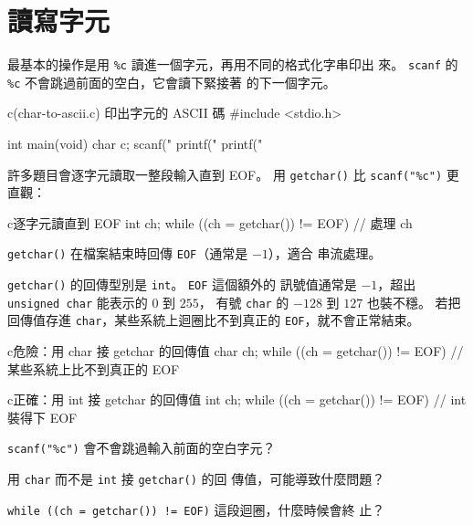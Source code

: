 \section{讀寫字元}
\label{sec:char-io}

最基本的操作是用 \texttt{\%c} 讀進一個字元，再用不同的格式化字串印出
來。 \texttt{scanf} 的 \texttt{\%c} 不會跳過前面的空白，它會讀下緊接著
的下一個字元。

\begin{example}{c}{(char-to-ascii.c) 印出字元的 ASCII 碼}
#include <stdio.h>

int main(void) {
    char c;
    scanf("%
    printf("%
    printf("%
}
\end{example}


許多題目會逐字元讀取一整段輸入直到 EOF。 用 \texttt{getchar()} 比
\texttt{scanf("\%c")} 更直觀：

\begin{code}{c}{逐字元讀直到 EOF}
int ch;
while ((ch = getchar()) != EOF) {
    // 處理 ch
}
\end{code}

\texttt{getchar()} 在檔案結束時回傳 \texttt{EOF}（通常是 $-1$），適合
串流處理。

\texttt{getchar()} 的回傳型別是 \texttt{int}。 \texttt{EOF} 這個額外的
訊號值通常是 $-1$，超出 \texttt{unsigned char} 能表示的 $0$ 到 $255$，
有號 \texttt{char} 的 $-128$ 到 $127$ 也裝不穩。 若把回傳值存進
\texttt{char}，某些系統上迴圈比不到真正的 \texttt{EOF}，就不會正常結束。

\begin{code}{c}{危險：用 char 接 getchar 的回傳值}
char ch;
while ((ch = getchar()) != EOF) {
    // 某些系統上比不到真正的 EOF
}
\end{code}

\begin{code}{c}{正確：用 int 接 getchar 的回傳值}
int ch;
while ((ch = getchar()) != EOF) {
    // int 裝得下 EOF
}
\end{code}


\begin{drills}[label=drills:char-io]
\item \texttt{scanf("\%c")} 會不會跳過輸入前面的空白字元？
\item 用 \texttt{char} 而不是 \texttt{int} 接 \texttt{getchar()} 的回
傳值，可能導致什麼問題？
\item \texttt{while ((ch = getchar()) != EOF)} 這段迴圈，什麼時候會終
止？
\end{drills}

